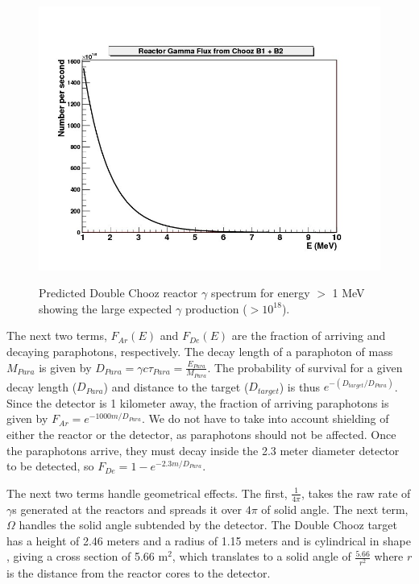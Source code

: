\begin{figure}
\caption{Predicted Double Chooz reactor $\gamma$ spectrum for energy $>$ 1 MeV showing the large expected $\gamma$ production ($>10^{18}$).}
\includegraphics[width=\textwidth]{Paraphotons/Gamma_Flux.jpg}
\label{Gamma_Flux}
\end{figure}
 
The next two terms, $F_{Ar}(E)$ and $F_{De}(E)$ are the fraction of arriving and decaying paraphotons, respectively.  The decay length of a paraphoton of mass $M_{Para}$ is given by $D_{Para} = \gamma c \tau_{Para} = \frac{E_{Para}}{M_{Para}}$. The probability of survival for a given decay length ($D_{Para}$) and distance to the target ($D_{target}$) is thus $e^{-(D_{target}/D_{Para})}$. Since the detector is 1 kilometer away, the fraction of arriving paraphotons is given by $F_{Ar} = e^{-1000 m /D_{Para}}$. We do not have to take into account shielding of either the reactor or the detector, as paraphotons should not be affected. Once the paraphotons arrive, they must decay inside the 2.3 meter diameter detector to be detected, so $F_{De} = 1- e^{-2.3 m /D_{Para}}$.

The next two terms handle geometrical effects. The first, $\frac{1}{4 \pi}$, takes the raw rate of $\gamma$s generated at the reactors and spreads it over $4 \pi$ of solid angle. The next term, $\Omega$ handles the solid angle subtended by the detector. The Double Chooz target has a height of 2.46 meters and a radius of 1.15 meters and is cylindrical in shape \cite{DC_2012}, giving a cross section of 5.66 m$^2$, which translates to a solid angle of $\frac{5.66}{r^2}$ where $r$ is the distance from the reactor cores to the detector. 

